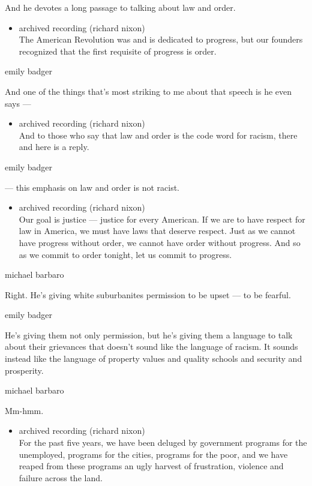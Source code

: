 And he devotes a long passage to talking about law and order.

\begin{itemize}
\tightlist
\item
  archived recording (richard nixon)\\
  The American Revolution was and is dedicated to progress, but our
  founders recognized that the first requisite of progress is order.
\end{itemize}

emily badger

And one of the things that's most striking to me about that speech is he
even says ---

\begin{itemize}
\tightlist
\item
  archived recording (richard nixon)\\
  And to those who say that law and order is the code word for racism,
  there and here is a reply.
\end{itemize}

emily badger

--- this emphasis on law and order is not racist.

\begin{itemize}
\tightlist
\item
  archived recording (richard nixon)\\
  Our goal is justice --- justice for every American. If we are to have
  respect for law in America, we must have laws that deserve respect.
  Just as we cannot have progress without order, we cannot have order
  without progress. And so as we commit to order tonight, let us commit
  to progress.
\end{itemize}

michael barbaro

Right. He's giving white suburbanites permission to be upset --- to be
fearful.

emily badger

He's giving them not only permission, but he's giving them a language to
talk about their grievances that doesn't sound like the language of
racism. It sounds instead like the language of property values and
quality schools and security and prosperity.

michael barbaro

Mm-hmm.

\begin{itemize}
\tightlist
\item
  archived recording (richard nixon)\\
  For the past five years, we have been deluged by government programs
  for the unemployed, programs for the cities, programs for the poor,
  and we have reaped from these programs an ugly harvest of frustration,
  violence and failure across the land.
\end{itemize}

